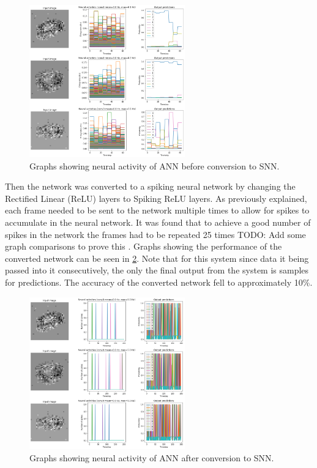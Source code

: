 \begin{figure}[htb]%
    \centering
    \includegraphics[width=0.6\textwidth]{implementation/images/pre_snn_conversion.png}
    \caption{Graphs showing neural activity of ANN before conversion to SNN.}%
    \label{fig:pre_snn_conversion}%
\end{figure}

Then the network was converted to a spiking neural network by changing the Rectified Linear (ReLU) layers to Spiking ReLU layers. As previously explained, each frame needed to be sent to the network multiple times to allow for spikes to accumulate in the neural network. It was found that to achieve a good number of spikes in the network the frames had to be repeated 25 times \color{red} TODO: Add some graph comparisons to prove this \color{black}. Graphs showing the performance of the converted network can be seen in \cref{fig:post_snn_conversion}. Note that for this system since data it being passed into it consecutively, the only the final output from the system is samples for predictions. The accuracy of the converted network fell to approximately 10\%.

\begin{figure}[htb]%
    \centering
    \includegraphics[width=0.6\textwidth]{implementation/images/post_snn_conversion.png}
    \caption{Graphs showing neural activity of ANN after conversion to SNN.}%
    \label{fig:post_snn_conversion}%
\end{figure}

